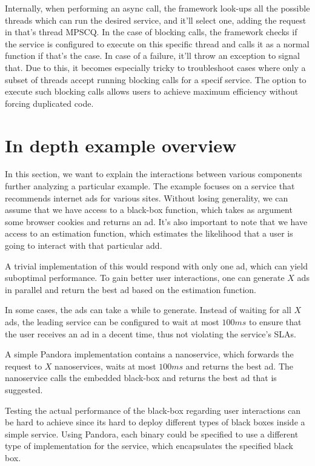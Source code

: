 Internally, when performing an async call, the framework look-ups all the possible threads which can run the desired service, and it'll select one, adding the request in that's thread MPSCQ. In the case of blocking calls, the framework checks if the service is configured to execute on this specific thread and calls it as a normal function if that's the case. In case of a failure, it'll throw an exception to signal that. Due to this, it becomes especially tricky to troubleshoot cases where only a subset of threads accept running blocking calls for a specif service.
The option to execute such blocking calls allows users to achieve maximum efficiency without forcing duplicated code.





\section{In depth example overview}
In this section, we want to explain the interactions between various components further analyzing a particular example. The example focuses on a service that recommends internet ads for various sites. Without losing generality, we can assume that we have access to a black-box function, which takes as argument some browser cookies and returns an ad. It's also important to note that we have access to an estimation function, which estimates the likelihood that a user is going to interact with that particular add.

A trivial implementation of this would respond with only one ad, which can yield suboptimal performance. To gain better user interactions, one can generate $X$ ads in parallel and return the best ad based on the estimation function. 

In some cases, the ads can take a while to generate. Instead of waiting for all $X$ ads, the leading service can be configured to wait at most $100ms$ to ensure that the user receives an ad in a decent time, thus not violating the service's SLAs.

A simple Pandora implementation contains a  nanoservice, which forwards the request to $X$  nanoservices, waits at most $100ms$ and returns the best ad. The  nanoservice calls the embedded black-box and returns the best ad that is suggested.

Testing the actual performance of the black-box regarding user interactions can be hard to achieve since its hard to deploy different types of black boxes inside a simple service. Using Pandora, each binary could be specified to use a different type of implementation for the  service, which encapsulates the specified black box.

